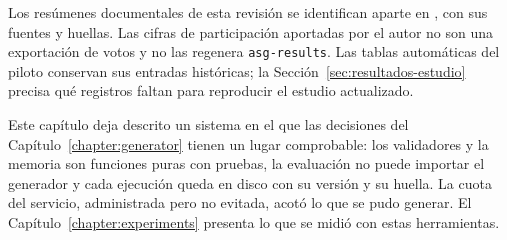 Los resúmenes documentales de esta revisión se identifican aparte en
, con sus fuentes y huellas. Las cifras de participación
aportadas por el autor no son una exportación de votos y no las regenera \texttt{asg-results}.
Las tablas automáticas del piloto conservan sus entradas históricas; la
Sección~\ref{sec:resultados-estudio} precisa qué registros faltan para reproducir el estudio actualizado.

Este capítulo deja descrito un sistema en el que las decisiones del Capítulo~\ref{chapter:generator}
tienen un lugar comprobable: los validadores y la memoria son funciones puras con pruebas, la
evaluación no puede importar el generador y cada ejecución queda en disco con su versión y su
huella. La cuota del servicio, administrada pero no evitada, acotó lo que se pudo generar. El
Capítulo~\ref{chapter:experiments} presenta lo que se midió con estas herramientas.
